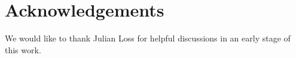 \section*{Acknowledgements}
We would like to thank Julian Loss for helpful discussions in an early stage of this work. 
